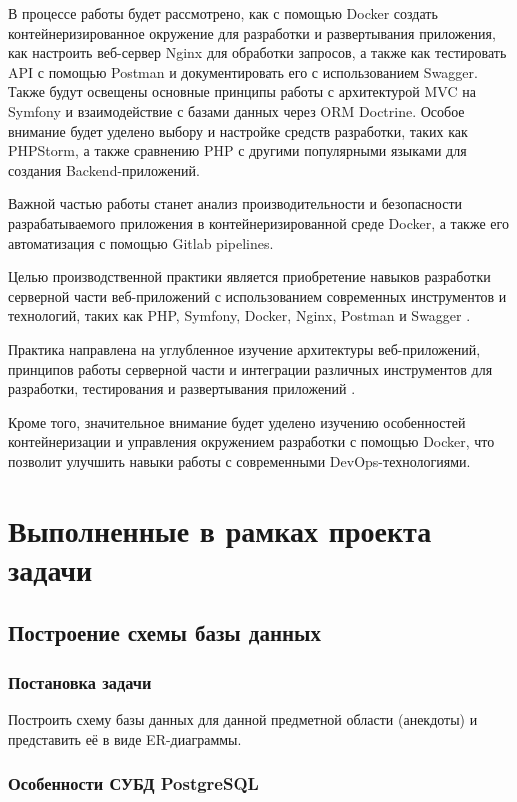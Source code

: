 \documentclass[pract]{SCWorks}
\begin{document}
В процессе работы будет рассмотрено, как с помощью Docker
создать контейнеризированное окружение для разработки и развертывания
приложения, как настроить веб-сервер Nginx для обработки запросов, а также
как тестировать API с помощью Postman и документировать его с использованием
Swagger. Также будут освещены основные принципы работы с архитектурой 
MVC на Symfony и взаимодействие с базами данных через ORM Doctrine. 
Особое внимание будет уделено выбору и настройке средств разработки, 
таких как PHPStorm, а также сравнению PHP с другими популярными языками 
для создания Backend-приложений. 

Важной частью работы станет анализ производительности и безопасности 
разрабатываемого приложения в контейнеризированной среде Docker, а также его
автоматизация с помощью Gitlab pipelines.

Целью производственной практики является приобретение навыков разработки 
серверной части веб-приложений с использованием современных инструментов 
и технологий, таких как PHP, Symfony, Docker, Nginx, Postman и Swagger
\cite{symfony_docs, robots_net_symfony}.

Практика направлена на углубленное изучение архитектуры веб-приложений, 
принципов работы серверной части и интеграции различных инструментов 
для разработки, тестирования и развертывания приложений 
\cite{postman_api_testing, postman_docs, nginx_docs}.

Кроме того, значительное внимание будет уделено изучению особенностей
контейнеризации и управления окружением разработки с помощью Docker,
что позволит улучшить навыки работы с современными DevOps-технологиями.

\section{Выполненные в рамках проекта задачи}

\subsection{Построение схемы базы данных}

\subsubsection{Постановка задачи}

Построить схему базы данных для данной предметной области (анекдоты) и 
представить её в виде ER-диаграммы.

\subsubsection{Особенности СУБД PostgreSQL}
\end{document}
